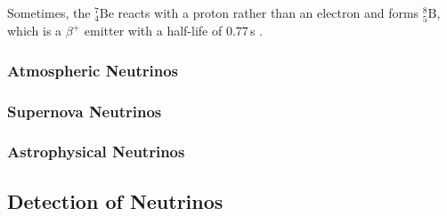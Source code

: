 Sometimes, the $^7_4\mathrm{Be}$ reacts with a proton rather than an electron
and forms $^8_5\mathrm{B}$, which is a $\beta^+$ emitter with a half-life of
0.77\,s \cite{Nuklidkarte}.


\subsubsection{Atmospheric Neutrinos}
\label{sec:AtmNus}


\subsubsection{Supernova Neutrinos}

\subsubsection{Astrophysical Neutrinos}

\subsection{Detection of Neutrinos}